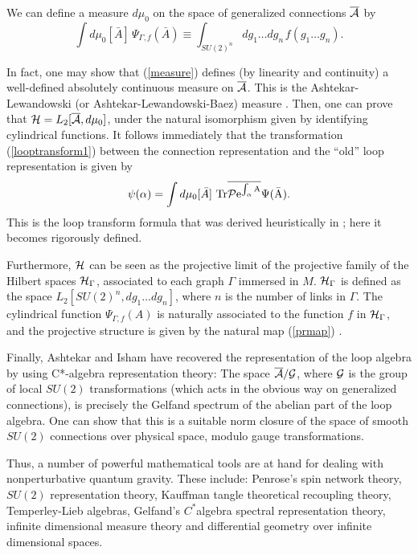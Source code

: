 We can define a measure $d\mu_{0}$ on the space of generalized 
connections $\overline{\cal A}$ by
\begin{equation}
	\int d\mu_{0}[\bar A]\, \Psi_{\Gamma,f}(\bar A)
	\equiv \int_{SU(2)^{n}} \!\!\!\! 
	dg_{1}\ldots dg_{n\,} f(g_{1}\ldots g_{n}).
	\label{measure}
\end{equation}

In fact, one may show that (\ref{measure}) defines (by linearity 
and continuity) a well-defined absolutely continuous measure on 
$\overline{\cal A}$.  This is the Ashtekar-Lewandowski (or 
Ashtekar-Lewandowski-Baez) measure 
\cite{AshtekarLewandowski,AshtekarLewandowski3,%
AshtekarLewandowski2,Baez}.  Then, one can prove that ${\cal H} = 
L_{2}[\overline{\cal A},d\mu_0]$, under the natural isomorphism 
given by identifying cylindrical functions.  It follows 
immediately that the transformation (\ref{looptransform1}) between 
the connection representation and the ``old'' loop representation 
is given by
\begin{equation}
	\psi(\alpha)=\int d\mu_{0}[\bar A] \ 
	\rm{Tr} \overline{{\cal P} e^{\int_{\alpha}A}}	\Psi(\bar A).
	\label{looptransform}
\end{equation}
This is the loop transform formula that was derived heuristically 
in \cite{RovelliSmolin90}; here it becomes rigorously defined. 

Furthermore, $\cal H$ can be seen as the projective limit of the 
projective family of the Hilbert spaces ${\cal H}_{\Gamma}$, 
associated to each graph $\Gamma$ immersed in $M$.  ${\cal 
H}_{\Gamma}$ is defined as the space $L_{2}[SU(2)^{n}, dg_{1} 
\ldots dg_{n}]$, where $n$ is the number of links in $\Gamma$. 
The cylindrical function $\Psi_{\Gamma,f}(A)$ is naturally 
associated to the function $f$ in ${\cal H}_{\Gamma}$, and the
projective structure is given by the natural map (\ref{prmap})  
\cite{AshtekarEtAl95,MarolfMourao}. 

Finally, Ashtekar and Isham \cite{AshtekarIsham} have recovered 
the representation of the loop algebra by using C*-algebra 
representation theory: The space $\overline{\cal A}/{\cal G}$, 
where $\cal G$ is the group of local $SU(2)$ transformations 
(which acts in the obvious way on generalized connections), is 
precisely the Gelfand spectrum of the abelian part of the loop 
algebra.  One can show that this is a suitable norm closure of 
the space of smooth $SU(2)$ connections over physical space, 
modulo gauge transformations.

Thus, a number of powerful mathematical tools are at hand for 
dealing with nonperturbative quantum gravity.   These 
include: Penrose's spin network theory, $SU(2)$ 
representation theory, Kauffman tangle theoretical recoupling 
theory, Temperley-Lieb algebras, Gelfand's $C^*$algebra 
spectral representation theory, infinite dimensional measure 
theory and differential geometry over infinite dimensional 
spaces.

